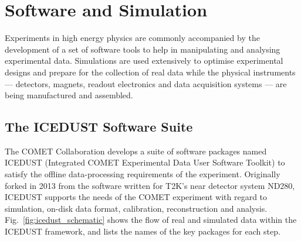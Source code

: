 \chapter{Software and Simulation}
\label{chapter3}

\newcommand{\SimG}{\texttt{SimG4}\xspace}
\newcommand{\oaEvent}{\texttt{oaEvent}\xspace}
\newcommand{\Geant}{{\sc Geant4}\xspace}


 
    
    
    



Experiments in high energy physics are commonly accompanied by the development of a set of software tools to help in manipulating and analysing experimental data. Simulations are used extensively to optimise experimental designs and prepare for the collection of real data while the physical instruments --- detectors, magnets, readout electronics and data acquisition systems --- are being manufactured and assembled.

\section{The ICEDUST Software Suite}
The COMET Collaboration develops a suite of software packages named ICEDUST (Integrated COMET Experimental Data User Software Toolkit) to satisfy the offline data-processing requirements of the experiment. Originally forked in 2013 from the software written for T2K's near detector system ND280, ICEDUST supports the needs of the COMET experiment with regard to simulation, on-disk data format, calibration, reconstruction and analysis. Fig.~\ref{fig:icedust_schematic} shows the flow of real and simulated data within the ICEDUST framework, and lists the names of the key packages for each step.


